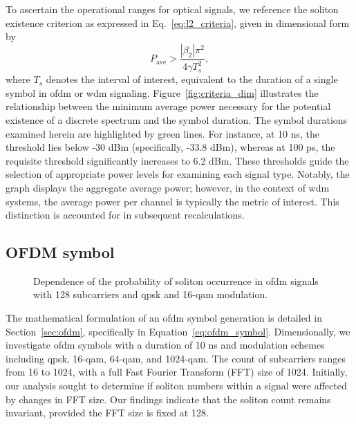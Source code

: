To ascertain the operational ranges for optical signals, we reference the soliton existence criterion as expressed in Eq.~\eqref{eq:l2_criteria}, given in dimensional form by
\begin{equation}
    P_{\text{ave}} > \frac{|\beta_2| \pi^2}{4\gamma T_s^2},
    \label{eq:pave_criteria}
\end{equation}
where \( T_s \) denotes the interval of interest, equivalent to the duration of a single symbol in \acrshort{ofdm} or \acrshort{wdm} signaling. Figure~\ref{fig:criteria_dim} illustrates the relationship between the minimum average power necessary for the potential existence of a discrete spectrum and the symbol duration. The symbol durations examined herein are highlighted by green lines. For instance, at 10 ns, the threshold lies below -30 dBm (specifically, -33.8 dBm), whereas at 100 ps, the requisite threshold significantly increases to 6.2 dBm. These thresholds guide the selection of appropriate power levels for examining each signal type. Notably, the graph displays the aggregate average power; however, in the context of \acrshort{wdm} systems, the average power per channel is typically the metric of interest. This distinction is accounted for in subsequent recalculations.



\subsection{OFDM symbol}

\begin{figure}[htpb]
    \caption{Dependence of the probability of soliton occurrence in \acrshort{ofdm} signals with 128 subcarriers and \acrshort{qpsk} and 16-\acrshort{qam} modulation.}
    \label{fig:ofdm_result_1}
\end{figure}

The mathematical formulation of an \acrshort{ofdm} symbol generation is detailed in Section~\ref{sec:ofdm}, specifically in Equation~\ref{eq:ofdm_symbol}. Dimensionally, we investigate \acrshort{ofdm} symbols with a duration of 10 ns and modulation schemes including \acrshort{qpsk}, 16-\acrshort{qam}, 64-\acrshort{qam}, and 1024-\acrshort{qam}. The count of subcarriers ranges from 16 to 1024, with a full Fast Fourier Transform (FFT) size of 1024. Initially, our analysis sought to determine if soliton numbers within a signal were affected by changes in FFT size. Our findings indicate that the soliton count remains invariant, provided the FFT size is fixed at 128.

